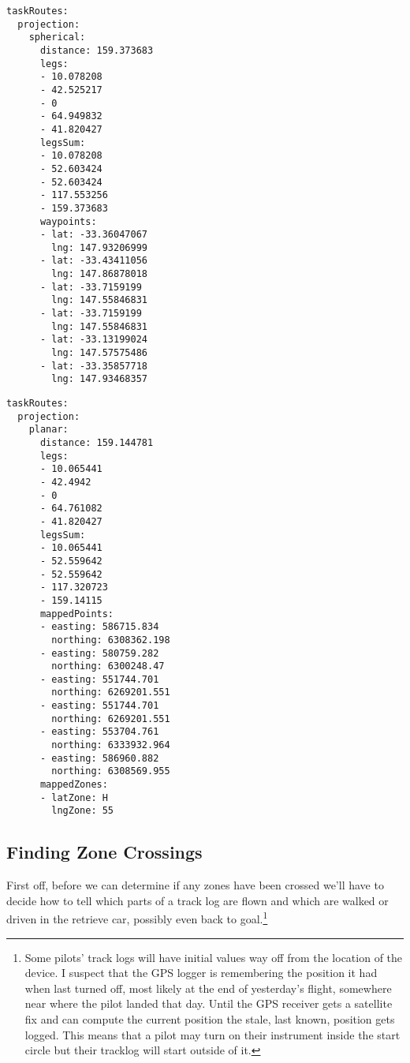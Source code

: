 \documentclass[gap.tex]{subfiles}
\begin{document}
\begin{lstlisting}[caption={Points on the plane, distances on the sphere, \texttt{projection/spherical} nodes of
\texttt{*.task-length.yaml}.}]
taskRoutes:
  projection:
    spherical:
      distance: 159.373683
      legs:
      - 10.078208
      - 42.525217
      - 0
      - 64.949832
      - 41.820427
      legsSum:
      - 10.078208
      - 52.603424
      - 52.603424
      - 117.553256
      - 159.373683
      waypoints:
      - lat: -33.36047067
        lng: 147.93206999
      - lat: -33.43411056
        lng: 147.86878018
      - lat: -33.7159199
        lng: 147.55846831
      - lat: -33.7159199
        lng: 147.55846831
      - lat: -33.13199024
        lng: 147.57575486
      - lat: -33.35857718
        lng: 147.93468357
\end{lstlisting}
\begin{lstlisting}[caption={Points and distances on the plane, \texttt{projection/planar} nodes of
\texttt{*.task-length.yaml}.}]
taskRoutes:
  projection:
    planar:
      distance: 159.144781
      legs:
      - 10.065441
      - 42.4942
      - 0
      - 64.761082
      - 41.820427
      legsSum:
      - 10.065441
      - 52.559642
      - 52.559642
      - 117.320723
      - 159.14115
      mappedPoints:
      - easting: 586715.834
        northing: 6308362.198
      - easting: 580759.282
        northing: 6300248.47
      - easting: 551744.701
        northing: 6269201.551
      - easting: 551744.701
        northing: 6269201.551
      - easting: 553704.761
        northing: 6333932.964
      - easting: 586960.882
        northing: 6308569.955
      mappedZones:
      - latZone: H
        lngZone: 55
\end{lstlisting}

\newpage
\subsection{Finding Zone Crossings}

First off, before we can determine if any zones have been crossed we'll have to
decide how to tell which parts of a track log are flown and which are walked or
driven in the retrieve car, possibly even back to goal.\footnote{Some pilots'
track logs will have initial values way off from the location of the device.
I suspect that the GPS logger is remembering the position it had when last
turned off, most likely at the end of yesterday's flight, somewhere near where
the pilot landed that day. Until the GPS receiver gets a satellite fix and can
compute the current position the stale, last known, position gets logged. This
means that a pilot may turn on their instrument inside the start circle but
their tracklog will start outside of it.}
\end{document}

